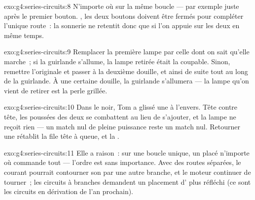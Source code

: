 \begin{solution}{exo:g4:series-circuits:8}
N'importe où sur la même boucle --- par exemple juste après le
premier bouton. , les deux boutons doivent être fermés pour
compléter l'unique route~: la sonnerie ne retentit donc que si l'on
appuie sur les deux en même temps.
\end{solution}

\begin{solution}{exo:g4:series-circuits:9}
Remplacer la première lampe par celle dont on sait qu'elle marche~;
si la guirlande s'allume, la lampe retirée était la coupable. Sinon,
remettre l'originale et passer à la deuxième douille, et ainsi de
suite tout au long de la guirlande. À une certaine douille, la
guirlande s'allumera --- la lampe qu'on vient de retirer est la perle
grillée.
\end{solution}

\begin{solution}{exo:g4:series-circuits:10}
Dans le noir, Tom a glissé une  à l'envers. Tête contre tête, les
poussées des deux  se combattent au lieu de s'ajouter, et la
lampe ne reçoit rien --- un match nul de pleine puissance reste un
match nul. Retourner une  rétablit la file tête à queue, et la
.
\end{solution}

\begin{solution}{exo:g4:series-circuits:11}
Elle a raison~: sur une boucle unique, un  placé
n'importe où commande tout --- l'ordre est sans importance. Avec des
routes séparées, le courant pourrait contourner son  par
une autre branche, et le moteur continuer de tourner~; les circuits à
branches demandent un placement d' plus réfléchi (ce sont
les circuits en dérivation de l'an prochain).
\end{solution}
